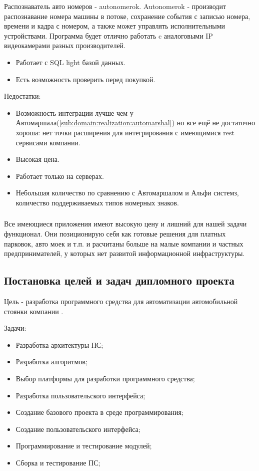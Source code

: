 Распознаватель авто номеров - autonomerok. Autonomerok - производит распознавание номера машины в потоке, сохранение события с записью номера, времени и кадра с номером, а также может управлять исполнительными устройствами. Программа будет отлично работать c аналоговыми IP видеокамерами разных производителей.
\begin{itemize}
  \item Работает с SQL light базой данных.
  \item Есть возможность проверить перед покупкой.
\end{itemize}
Недостатки:
\begin{itemize}
  \item Возможность интеграции лучше чем у Автомаршала(\ref{sub:domain:realization:automarshal}) но все ещё не достаточно хороша: нет точки расширения для интегрирования с имеющимися rest сервисами компании.
  \item Высокая цена.
  \item Работает только на \windows{} серверах.
  \item Небольшая количество по сравнению с Автомаршалом и Альфи системз, количество поддерживаемых типов номерных знаков.
\end{itemize}

\subsubsection{} Все имеющиеся приложения имеют высокую цену и лишний для нашей задачи функционал. Они позиционирую себя как готовые решения для платных парковок, авто моек и т.п. и расчитаны больше на малые компании и частных предпринимателей, у которых нет развитой информационной инфраструктуры. 

\subsection{Постановка целей и задач дипломного проекта}
Цель - разработка программного средства для автоматизации автомобильной стоянки компании \company{}.


Задачи:
\begin{itemize}
  \item Разработка архитектуры ПС;
  \item Разработка алгоритмов;
  \item Выбор платформы для разработки программного средства;
  \item Разработка пользовательского интерфейса;
  \item Создание базового проекта в среде программирования;
  \item Создание пользовательского интерфейса;
  \item Программирование и тестирование модулей;
  \item Сборка и тестирование ПС;
\end{itemize}
